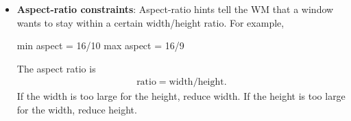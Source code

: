 \documentclass{report}
\begin{document}
\begin{itemize}
                \bigbreak \noindent 
                \begin{cppcode}
                XGetWMNormalHints
                \end{cppcode}
                \bigbreak \noindent 
                They are stored in \textbf{XSizeHints}. Important fields include
                \bigbreak \noindent 
                \begin{cppcode}
                    PMinSize      minimum width/height
                    PMaxSize      maximum width/height
                    PBaseSize     base width/height
                    PResizeInc    resize increment
                    PAspect       aspect ratio constraints
                \end{cppcode}
                \bigbreak \noindent 
                Some applications do not want arbitrary sizes.
            \item \textbf{Aspect-ratio constraints}: Aspect-ratio hints tell the WM that a window wants to stay within a certain width/height ratio.
                \bigbreak \noindent 
                For example, 
                \bigbreak \noindent 
                \begin{cppcode}
                    min aspect = 16/10
                    max aspect = 16/9
                \end{cppcode}
                \bigbreak \noindent 
                The aspect ratio is 
                \begin{align*}
                    \text{ratio} = \text{width} / \text{height}
                .\end{align*}
                If the width is too large for the height, reduce width.
                \bigbreak \noindent 
                If the height is too large for the width, reduce height.

    \end{itemize}
\end{document}

